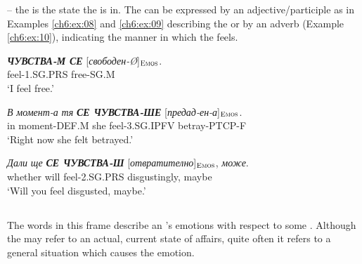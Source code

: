 \documentclass[output=paper,colorlinks,citecolor=brown]{langscibook}
\begin{document}
 -- the  is the state the  is in. The  can be expressed by an adjective/participle as in Examples \ref{ch6:ex:08} and \ref{ch6:ex:09} describing the  or by an adverb (Example \ref{ch6:ex:10}), indicating the manner in which the  feels.

\begin{exe} 
\ex  \label{ch6:ex:08} 
\gll \textit{\textbf{ЧУВСТВА-М СЕ}}  [\textit{свободен-Ø}]$_{\text{\textsc{Emos}}}$. \\ 
feel-1.SG.PRS  free-SG.M \\ %
\glt `I feel free.' 
\end{exe}

\begin{exe} 
\ex  \label{ch6:ex:09} 
    \settowidth {} 
\gll \textit{В} \textit{момент-а} \textit{тя} \textit{\textbf{СЕ ЧУВСТВА-ШЕ}}  [\textit{предад-ен-а}]$_{\text{\textsc{Emos}}}$.   \\ 
in {moment-DEF.M} she feel-3.SG.IPFV betray-PTCP-F \\ %
\glt `Right now she felt betrayed.' 
\end{exe}

\begin{exe} 
\ex  \label{ch6:ex:10} 
\gll \textit{Дали} \textit{ще} \textit{\textbf{СЕ ЧУВСТВА-Ш}}  [\textit{отвратително}]$_{\text{\textsc{Emos}}}$, \textit{може}.   \\ 
whether will feel-2.SG.PRS disgustingly, maybe \\ %
\glt `Will you feel disgusted, maybe.' 
\end{exe}

\subsection{}\label{ch6:sec:expfocem}

\begin{description}[font=\normalfont]
\item[Definition:] The words in this frame describe an 's emotions with respect to some . Although the  may refer to an actual, current state of affairs, quite often it refers to a general situation which causes the emotion.
\end{description}
\end{document}
